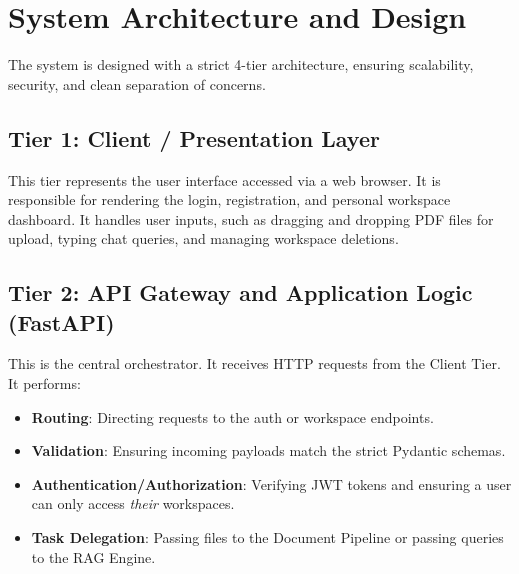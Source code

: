 \documentclass[12pt, a4paper]{report}
\begin{document}
\chapter{System Architecture and Design}

The system is designed with a strict 4-tier architecture, ensuring scalability, security, and clean separation of concerns.

\section{Tier 1: Client / Presentation Layer}
This tier represents the user interface accessed via a web browser. It is responsible for rendering the login, registration, and personal workspace dashboard. It handles user inputs, such as dragging and dropping PDF files for upload, typing chat queries, and managing workspace deletions.

\section{Tier 2: API Gateway and Application Logic (FastAPI)}
This is the central orchestrator. It receives HTTP requests from the Client Tier. It performs:
\begin{itemize}
    \item \textbf{Routing}: Directing requests to the auth or workspace endpoints.
    \item \textbf{Validation}: Ensuring incoming payloads match the strict Pydantic schemas.
    \item \textbf{Authentication/Authorization}: Verifying JWT tokens and ensuring a user can only access \textit{their} workspaces.
    \item \textbf{Task Delegation}: Passing files to the Document Pipeline or passing queries to the RAG Engine.
\end{itemize}
\end{document}
